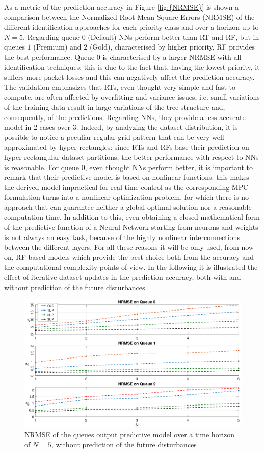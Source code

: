 As a metric of the prediction accuracy in Figure \ref{fig:{NRMSE}} is shown a comparison between the Normalized Root Mean Square Errors (NRMSE) of the different identification approaches for each priority class and over a horizon up to $N=5$. Regarding queue $0$ (Default) NNs perform better than RT and RF, but in queues $1$ (Premium) and $2$ (Gold), characterised by higher priority, RF provides the best performance. Queue $0$ is characterised by a larger NRMSE with all identification techniques: this is due to the fact that, having the lowest priority, it suffers more packet losses and this can negatively affect the prediction accuracy. The validation emphasizes that RTs, even thought very simple and fast to compute, are often affected by overfitting and variance issues, i.e. small variations of the training data result in large variations of the tree structure and, consequently, of the predictions. Regarding NNs, they provide a less accurate model in 2 cases over 3. Indeed, by analyzing the dataset distribution, it is possible to notice a peculiar regular grid pattern that can be very well approximated by hyper-rectangles: since RTs and RFs base their prediction on hyper-rectangular dataset partitions, the better performance with respect to NNs is reasonable. For queue 0, even thought NNs perform better, it is important to remark that their predictive model is based on nonlinear functions: this makes the derived model impractical for real-time control as the corresponding MPC formulation turns into a nonlinear optimization problem, for which there is no approach that can guarantee neither a global optimal solution nor a reasonable computation time. In addition to this, even obtaining a closed mathematical form of the predictive function of a Neural Network starting from neurons and weights is not always an easy task, because of the highly nonlinear interconnections between the different layers. For all these reasons it will be only used, from now on, RF-based models which provide the best choice both from the accuracy and the computational complexity points of view. In the following it is illustrated the effect of iterative dataset updates in the prediction accuracy, both with and without prediction of the future disturbances.
\begin{figure}[th!]
	\centering
	\includegraphics[trim={120 0 120 0}, width=0.9\linewidth]{figure/Error_State.eps}
	\caption{NRMSE of the queues output predictive model over a time horizon of $N=5$, without prediction of the future disturbances}
	\label{fig:{stateNRMSE}}
\end{figure}
